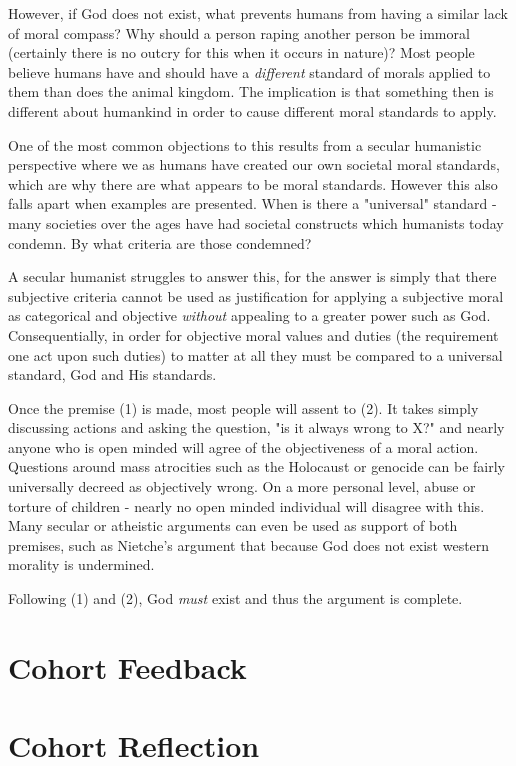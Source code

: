 \documentclass[12pt]{turabian-researchpaper}
\begin{document}
However, if God does not exist, what prevents humans from having a similar lack of moral compass? Why should a person raping another person be immoral (certainly there is no outcry for this when it occurs in nature)? Most people believe humans have and should have a \textit{different} standard of morals applied to them than does the animal kingdom. The implication is that something then is different about humankind in order to cause different moral standards to apply.

One of the most common objections to this results from a secular humanistic perspective where we as humans have created our own societal moral standards, which are why there are what appears to be moral standards. However this also falls apart when examples are presented. When is there a "universal" standard - many societies over the ages have had societal constructs which humanists today condemn. By what criteria are those condemned? 

A secular humanist struggles to answer this, for the answer is simply that there subjective criteria cannot be used as justification for applying a subjective moral as categorical and objective \textit{without} appealing to a greater power such as God. Consequentially, in order for objective moral values and duties (the requirement one act upon such duties) to matter at all they must be compared to a universal standard, God and His standards.

Once the premise (1) is made, most people will assent to (2). It takes simply discussing actions and asking the question, "is it always wrong to X?" and nearly anyone who is open minded will agree of the objectiveness of a moral action. Questions around mass atrocities such as the Holocaust or genocide can be fairly universally decreed as objectively wrong. On a more personal level, abuse or torture of children - nearly no open minded individual will disagree with this. Many secular or atheistic arguments can even be used as support of both premises, such as Nietche's argument that because God does not exist western morality is undermined. \autocite{evans2014}

Following (1) and (2), God \textit{must} exist and thus the argument is complete.
 


\section{Cohort Feedback}

\section{Cohort Reflection}


\newpage
\printbibliography
\end{document}
